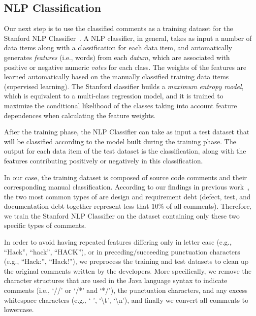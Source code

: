 
\subsection{NLP Classification} %
\label{sub:run_the_nlp_classifier}


Our next step is to use the classified \SATD comments as a training dataset for the Stanford NLP Classifier~\cite{Manning2014ACL}.
A NLP classifier, in general, takes as input a number of data items along with a classification for each data item,
and automatically generates \textit{features} (i.e., words) from each \textit{datum}, which are associated with positive or negative numeric \textit{votes} for each class.
The weights of the features are learned automatically based on the manually classified training data items (supervised learning).
The Stanford classifier builds a \textit{maximum entropy model}, which is equivalent to a multi-class regression model,
and it is trained to maximize the conditional likelihood of the classes taking into account feature dependences when calculating the feature weights.

After the training phase, the NLP Classifier can take as input a test dataset that will be classified according to the model built during the training phase.
The output for each data item of the test dataset is the classification, along with the features contributing positively or negatively in this classification.

In our case, the training dataset is composed of source code comments and their corresponding manual classification.
According to our findings in previous work~\cite{Maldonado2015MTD}, the two most common types of \SATD are design and requirement debt (defect, test, and documentation debt together represent less that 10\% of all \SATD comments).
Therefore, we train the Stanford NLP Classifier on the dataset containing only these two specific types of \SATD comments.

In order to avoid having repeated features differing only in letter case (e.g., ``Hack'', ``hack'', ``HACK''), or in preceding/succeeding punctuation characters (e.g., ``Hack:'', ``Hack!''), we preprocess the training and test datasets to clean up the original comments written by the developers. More specifically, we remove the character structures that are used in the Java language syntax to indicate comments (i.e., `//' or `/*' and `*/'), the punctuation characters, and any excess whitespace characters (e.g., ` ', `\textbackslash t', `\textbackslash n'), and finally we convert all comments to lowercase.


